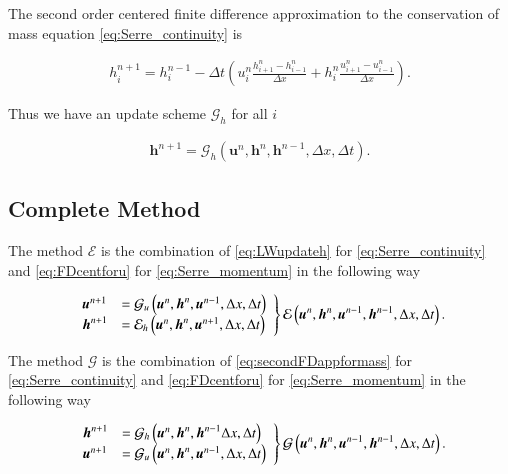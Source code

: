 \documentclass[times]{elsarticle}
\begin{document}
The second order centered finite difference approximation to the conservation of mass equation \eqref{eq:Serre_continuity} is
\begin{linenomath*}
	\begin{gather*}
	h^{n+1}_i = h^{n-1}_i - \Delta t \left(u^{n}_{i}\frac{h^{n}_{i+1} - h^{n}_{i-1}}{\Delta x} + h^{n}_{i}\frac{u^{n}_{i+1} - u^{n}_{i-1}}{\Delta x}\right).
	\end{gather*}
\end{linenomath*}
Thus we have an update scheme $\mathcal{G}_h$ for all $i$
\begin{linenomath*}
	\begin{gather}
	\label{eq:secondFDappformass}
	\boldsymbol{h}^{n+1} = \mathcal{G}_h\left(\boldsymbol{u}^n,\boldsymbol{h}^n,\boldsymbol{h}^{n-1} ,\Delta x, \Delta t \right).
	\end{gather}
\end{linenomath*}

\subsection{Complete Method}
The method $\mathcal{E}$ is the combination of \eqref{eq:LWupdateh} for \eqref{eq:Serre_continuity} and \eqref{eq:FDcentforu} for \eqref{eq:Serre_momentum} in the following way
\begin{linenomath*}
	\begin{gather}
	\left.
	\begin{array}{l l}
	\boldsymbol{u}^{n+1}&=\mathcal{G}_u\left(\boldsymbol{u}^n,\boldsymbol{h}^n, \boldsymbol{u}^{n-1}, \Delta x, \Delta t \right) \\
	\boldsymbol{h}^{n+1}&=\mathcal{E}_h\left(\boldsymbol{u}^n,\boldsymbol{h}^n,\boldsymbol{u}^{n+1}, \Delta x, \Delta t \right)
	\end{array} \right\rbrace \mathcal{E}\left(\boldsymbol{u}^n,\boldsymbol{h}^n, \boldsymbol{u}^{n-1},\boldsymbol{h}^{n-1}, \Delta x, \Delta t \right).	 
	\end{gather}
\end{linenomath*}

The method $\mathcal{G}$ is the combination of \eqref{eq:secondFDappformass} for \eqref{eq:Serre_continuity} and \eqref{eq:FDcentforu} for \eqref{eq:Serre_momentum} in the following way
\begin{linenomath*}
	\begin{gather}
	\left.
	\begin{array}{l l}
	\boldsymbol{h}^{n+1}&=\mathcal{G}_h\left(\boldsymbol{u}^n,\boldsymbol{h}^n,\boldsymbol{h}^{n-1} \Delta x, \Delta t \right) \\
	\boldsymbol{u}^{n+1}&=\mathcal{G}_u\left(\boldsymbol{u}^n,\boldsymbol{h}^n, \boldsymbol{u}^{n-1}, \Delta x, \Delta t \right)
	\end{array} \right\rbrace \mathcal{G}\left(\boldsymbol{u}^n,\boldsymbol{h}^n, \boldsymbol{u}^{n-1},\boldsymbol{h}^{n-1}, \Delta x, \Delta t \right).
	\label{eq:Gnumdef}
	\end{gather}
\end{linenomath*}
\end{document}
